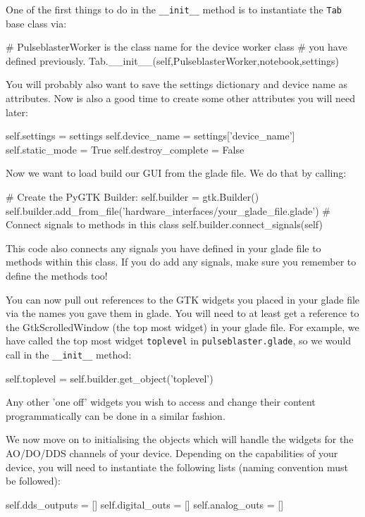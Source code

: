 \documentclass[12pt]{article}
\begin{document}
One of the first things to do in the \texttt{\_\_init\_\_} method is to instantiate the \texttt{Tab} base class via:
\begin{python}
		# PulseblasterWorker is the class name for the device worker class 
		# you have defined previously.
        Tab.__init__(self,PulseblasterWorker,notebook,settings)
\end{python}

You will probably also want to save the settings dictionary and device name as attributes. Now is also a good time to create some other attributes you will need later:
\begin{python}
        self.settings = settings
        self.device_name = settings['device_name']
        self.static_mode = True
        self.destroy_complete = False
\end{python}

Now we want to load build our GUI from the glade file. We do that by calling:
\begin{python}
        # Create the PyGTK Builder:
        self.builder = gtk.Builder()
        self.builder.add_from_file('hardware_interfaces/your_glade_file.glade')
        # Connect signals to methods in this class
        self.builder.connect_signals(self)
\end{python}
This code also connects any signals you have defined in your glade file to methods within this class. If you do add any signals, make sure you remember to define the methods too!

You can now pull out references to the GTK widgets you placed in your glade file via the names you gave them in glade. You will need to at least get a reference to the GtkScrolledWindow (the top most widget) in your glade file. For example, we have called the top most widget \texttt{toplevel} in \texttt{pulseblaster.glade}, so we would call in the \texttt{\_\_init\_\_} method:
\begin{python} 
        self.toplevel = self.builder.get_object('toplevel')
\end{python}
Any other 'one off' widgets you wish to access and change their content programmatically can be done in a similar fashion.

We now move on to initialising the objects which will handle the widgets for the AO/DO/DDS channels of your device. Depending on the capabilities of your device, you will need to instantiate the following lists (naming convention must be followed):
\begin{python}
        self.dds_outputs = []
        self.digital_outs = []
        self.analog_outs = []
\end{python}
\end{document}
